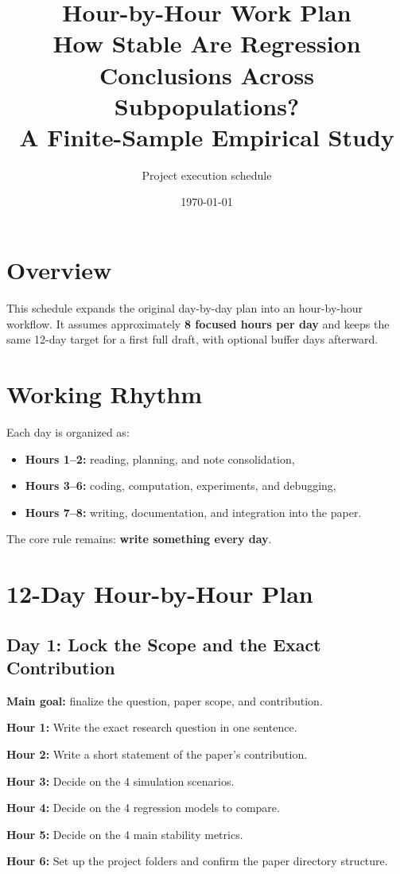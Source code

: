 \documentclass[11pt]{article}
\title{\textbf{Hour-by-Hour Work Plan}\\
How Stable Are Regression Conclusions Across Subpopulations?\\
A Finite-Sample Empirical Study}
\author{Project execution schedule}
\date{\today}
\begin{document}
\maketitle

\section{Overview}
This schedule expands the original day-by-day plan into an hour-by-hour workflow. It assumes approximately \textbf{8 focused hours per day} and keeps the same 12-day target for a first full draft, with optional buffer days afterward.

\section{Working Rhythm}
Each day is organized as:
\begin{itemize}
    \item \textbf{Hours 1--2:} reading, planning, and note consolidation,
    \item \textbf{Hours 3--6:} coding, computation, experiments, and debugging,
    \item \textbf{Hours 7--8:} writing, documentation, and integration into the paper.
\end{itemize}

The core rule remains: \textbf{write something every day}.

\section{12-Day Hour-by-Hour Plan}

\subsection*{Day 1: Lock the Scope and the Exact Contribution}
\textbf{Main goal:} finalize the question, paper scope, and contribution.

\textbf{Hour 1:} Write the exact research question in one sentence.

\textbf{Hour 2:} Write a short statement of the paper's contribution.

\textbf{Hour 3:} Decide on the 4 simulation scenarios.

\textbf{Hour 4:} Decide on the 4 regression models to compare.

\textbf{Hour 5:} Decide on the 4 main stability metrics.

\textbf{Hour 6:} Set up the project folders and confirm the paper directory structure.
\end{document}
